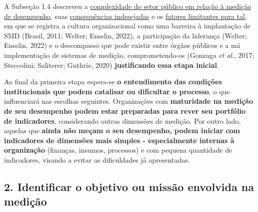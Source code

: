 \documentclass[
  letterpaper,
  DIV=11,
  numbers=noendperiod]{scrreprt}
\begin{document}
A Subseção 1.4 descreveu a
\href{/o/AZWDclIWFqqJuBEvyQWk/s/ws6bIBOPv2tLRHdwbB7y/~/changes/788/1.-apresentacao/1.4-consequencias-indesejadas-e-limitacoes-da-medicao-de-desempenho\#a-complexidade-da-gestao-organizacional-e-do-setor-publico}{complexidade
do setor público em relação à medição de desempenho}, suas
\href{/o/AZWDclIWFqqJuBEvyQWk/s/ws6bIBOPv2tLRHdwbB7y/~/changes/788/1.-apresentacao/1.4-consequencias-indesejadas-e-limitacoes-da-medicao-de-desempenho\#consequencias-indesejadas-dos-smd-no-setor-publico}{consequências
indesejadas} e os
\href{/o/AZWDclIWFqqJuBEvyQWk/s/ws6bIBOPv2tLRHdwbB7y/~/changes/788/1.-apresentacao/1.4-consequencias-indesejadas-e-limitacoes-da-medicao-de-desempenho\#fatores-limitantes-a-medicao-de-desempenho-no-setor-publico}{fatores
limitantes para tal}, em que se registra a cultura organizacional como
uma barreira à implantação de SMD (Brasil, 2011; Welter; Ensslin, 2022),
a participação da liderança (Welter; Ensslin, 2022) e o descompasso que
pode existir entre órgãos públicos e a má implementação de sistemas de
medição, comprometendo-os (Gonzaga \emph{et al}., 2017; Steccolini;
Saliterer; Guthrie, 2020) \textbf{justificando essa etapa inicial}.

Ao final da primeira etapa espera-se \textbf{o entendimento das
condições institucionais que podem catalisar ou dificultar o processo},
o que influenciará nas escolhas seguintes. Organizações com
\textbf{maturidade na medição de seu desempenho podem estar preparadas
para rever seu portfólio de indicadores}, considerando outras dimensões
de medição. Por outro lado, aquelas que \textbf{ainda não meçam o seu
desempenho, podem iniciar com indicadores de dimensões mais simples -
especialmente internas à organização} (finanças, insumos, processos) e
com pequena quantidade de indicadores, visando a evitar as dificuldades
já apresentadas.

\hypertarget{identificar-o-objetivo-ou-missuxe3o-envolvida-na-mediuxe7uxe3o}{%
\subsection*{2. Identificar o objetivo ou missão envolvida na
medição}\label{identificar-o-objetivo-ou-missuxe3o-envolvida-na-mediuxe7uxe3o}}
\end{document}
